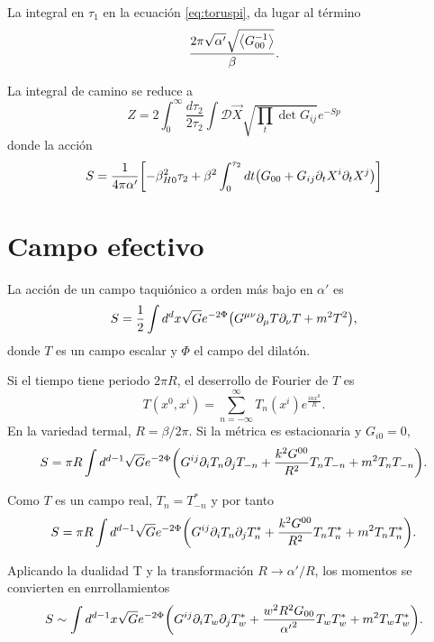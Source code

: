 La integral en $\tau_1$ en la ecuación \ref{eq:toruspi}, da lugar al término 
\begin{equation}
  \frac{2\pi\sqrt{\alpha'}\sqrt{\ev{G_{00}^{-1}}}}{\beta}.
\end{equation}

La integral de camino se reduce a 
\begin{equation}
  Z=2\int_0^\infty \frac{d\tau_2}{2\tau_2}\int \mathcal D \vec {X} \sqrt{\prod_t \det G_{ij}}e^{-Sp}
\end{equation}
donde la acción 
\begin{equation}
  S=\frac{1}{4\pi\alpha'}\qty[-\beta^2_{H0}\tau_2+\beta^2 \int_0^{\tau_2}dt \qty(G_{00}+G_{ij}\partial_t X^i\partial_t X^j)]
\end{equation}


\section{Campo efectivo}

La acción de un campo taquiónico a orden más bajo en $\alpha'$ es
\begin{equation}
  S=\frac{1}{2}\int d^d x\sqrt G e^{-2\Phi}  \qty(G^{\mu\nu}\partial_\mu T\partial_\nu T+m^2T^2),
\end{equation}
donde $T$ es un campo escalar y $\Phi$ el campo del dilatón.

Si el tiempo tiene periodo $2\pi R$, el deserrollo de Fourier de $T$ es
\begin{equation}
  T(x^0,x^i)=\sum_{n=-\infty}^{\infty} T_n(x^i)e^{\frac{inx^0}{R}}.
\end{equation}
En la variedad termal, $R=\beta/2\pi$. 
Si la métrica es estacionaria y $G_{i0}=0$,
\begin{equation}
  S=\pi R \int d^{d-1} \sqrt{G}e^{-2\Phi}\qty(G^{ij}\partial_i T_n \partial_j T_{-n} + \frac{k^2 G^{00}}{R^2}T_n T_{-n} + m^2 T_n T_{-n}).
\end{equation}

Como $T$ es un campo real, $T_n=T^*_{-n}$ y por tanto
\begin{equation}
  S=\pi R \int d^{d-1} \sqrt{G}e^{-2\Phi}\qty(G^{ij}\partial_i T_n \partial_j T_{n}^* + \frac{k^2 G^{00}}{R^2}T_n T_{n}^* + m^2 T_n T_{n}^*).
\end{equation}

Aplicando la dualidad T y la transformación $R\to \alpha'/R$, los momentos se convierten en 
enrrollamientos
\begin{equation}
  S \sim \int d^{d-1} x \sqrt G e^{-2\Phi}\qty(G^{ij}\partial_i T_w \partial_j T_{w}^* + \frac{w^2 R^2 G_{00}}{{\alpha'}^2}T_w T_{w}^* + m^2 T_w T_{w}^*) .
\end{equation}

